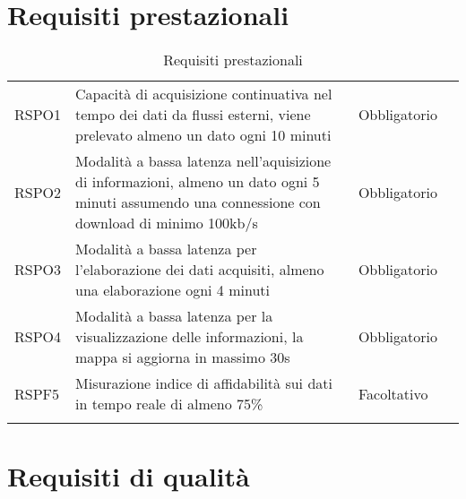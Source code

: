 {\begin{center}
\end{center}
\clearpage
\section{Requisiti prestazionali}\label{RequisitiPrestazionali}
\def\tabularxcolumn#1{m{#1}}
{

	\begin{center}
		\renewcommand{\arraystretch}{1.4}
		\begin{longtable}{|p{4cm}|p{4cm}|p{4cm}|p{3cm}|}
		\hline
		\rowcolor{airforceblue}
		\makecell[c]{\textbf{Codice RS}} & \makecell[c]{\textbf{Descrizione}} & \makecell[c]{\textbf{Tipo di requisito}} & \makecell[c]{\textbf{Fonte}} \\
		\hline
		\centering RSPO1 & Capacità di acquisizione continuativa nel tempo dei dati da flussi esterni, viene prelevato almeno un dato ogni 10 minuti &\centering  Obbligatorio & \makecell[tc]{Capitolato$_{\scaleto{G}{3pt}}$}  \\
		\hline
		\centering RSPO2 & Modalità a bassa latenza nell'aquisizione di informazioni, almeno un dato ogni 5 minuti assumendo una connessione con download di minimo 100kb/s & \centering Obbligatorio & \makecell[tc]{Interno} \\
		\hline
		\centering RSPO3 & Modalità a bassa latenza per l'elaborazione dei dati acquisiti, almeno una elaborazione ogni 4 minuti & \centering Obbligatorio & \makecell[tc]{Interno} \\
		\hline
		\centering RSPO4 & Modalità a bassa latenza per la visualizzazione delle informazioni, la mappa si aggiorna in massimo 30s & \centering Obbligatorio & \makecell[tc]{Interno} \\
		\hline
		\centering RSPF5 & Misurazione indice di affidabilità sui dati in tempo reale di almeno 75\% & \centering Facoltativo &\makecell[tc]{Interno} \\
		\hline
		\rowcolor{white}

		\caption[Requisiti prestazionali]{Requisiti prestazionali}\label{4.2}\\
			\end{longtable}
	\end{center}
\newpage
\section{Requisiti di qualità}\label{RequisitiDiQualita}
\def\tabularxcolumn#1{m{#1}}
{

}}}
